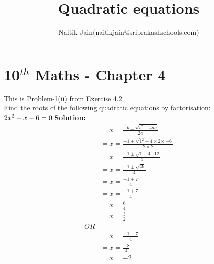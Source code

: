 \documentclass[12pt]{article}
\title{Quadratic equations}
\author{Naitik Jain(naitikjain@sriprakashschools.com)}
\newcommand{\solution}{\noindent \textbf{Solution: }}
\begin{document}
\section*{10$^{th}$ Maths - Chapter 4}
This is Problem-1(ii) from Exercise 4.2\\
Find the roots of the following quadratic equations by factorisation:\\
${{2}x^2+ {x} -{6} }= 0\\$
\solution\\
\begin{align}
&=x=\frac{-b\pm\sqrt{b^2-4ac}}{2a}\\
&=x=\frac{-1\pm\sqrt{1^2-4 \times 2\times -6}}{2 \times 2}\\
&=x=\frac{-1\pm\sqrt{1-{4}{-12}}}{4}\\
&=x=\frac{-1\pm\sqrt{49}}{4}\\
&=x=\frac{-1\pm{7}}{4}\\
&=x=\frac{-1+7}{4}\\
&=x=\frac{6}{4}\\
&=x=\frac{3}{2}\\
OR\\
&=x=\frac{-1-7}{4}\\
&=x=\frac{-8}{4}\\
&=x=-2
\end{align}
\end{document}
